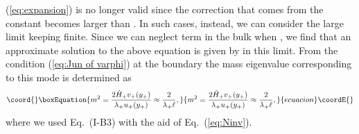 \documentclass[a4paper,showpacs,preprintnumbers,amsmath,amssymb]{revtex4}
\begin{document}
(\ref{eq:expansion}) is no longer valid since the correction that comes from the constant \coordHE{} becomes larger than \coordHE{}.
In such cases, instead, we can consider the large 
\myHighlight{$\lambda_+$}\coordHE{} limit keeping \coordHE{} finite. 
Since we can neglect \coordHE{} term in the bulk when \coordHE{}, we find that an approximate solution to the above equation is given by \coordHE{} in this limit. From the condition (\ref{eq:Jun of varphi}) at the boundary 
\coordHE{} the 
mass eigenvalue corresponding to this mode is determined as 
\begin{equation}\coord{}\boxEquation{
 m^2=\frac{2\dot H_+ v_+(y_+)}{\lambda_+ u_+(y_+)}
   \approx \frac{2}{\lambda_+ \ell},  
\label{eq:m2limit}
}{
 m^2=\frac{2\dot H_+ v_+(y_+)}{\lambda_+ u_+(y_+)}
   \approx \frac{2}{\lambda_+ \ell},  
}{ecuacion}\coordE{}\end{equation}
where we used Eq.~(I-B3) with the aid of Eq.~(\ref{eq:Ninv}).
\end{document}
